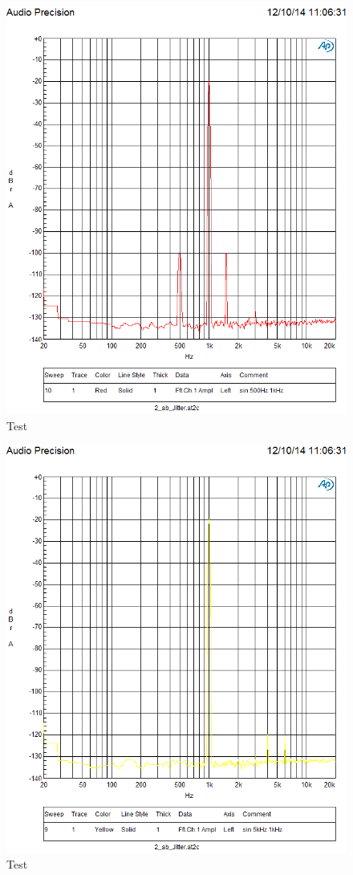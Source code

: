 \begin{figure}
\centering
\includegraphics[width=\columnwidth]{figures/Aufg2/10.PNG} 
\caption{Test}
\end{figure}

\begin{figure}
\centering
\includegraphics[width=\columnwidth]{figures/Aufg2/9.PNG} 
\caption{Test}
\end{figure}

